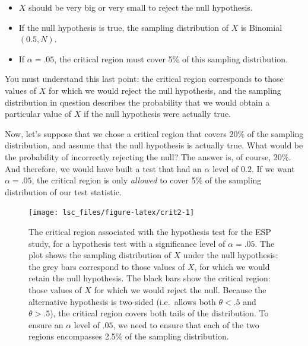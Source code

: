 \documentclass[
  11pt,
  a4paper,
  twoside,symmetric,openright]{book}
\providecommand{\tightlist}{%
  \setlength{\itemsep}{0pt}\setlength{\parskip}{0pt}}
\theoremstyle{break}
\theoremstyle{break}
\begin{document}
\begin{itemize}
\tightlist
\item
  \(X\) should be very big or very small to reject the null hypothesis.
\item
  If the null hypothesis is true, the sampling distribution of \(X\) is Binomial\((0.5, N)\).
\item
  If \(\alpha =.05\), the critical region must cover 5\% of this sampling distribution.
\end{itemize}

You must understand this last point: the critical region corresponds to those values of \(X\) for which we would reject the null hypothesis, and the sampling distribution in question describes the probability that we would obtain a particular value of \(X\) if the null hypothesis were actually true.

Now, let's suppose that we chose a critical region that covers 20\% of the sampling distribution, and assume that the null hypothesis is actually true. What would be the probability of incorrectly rejecting the null? The answer is, of course, 20\%. And therefore, we would have built a test that had an \(\alpha\) level of \(0.2\). If we want \(\alpha = .05\), the critical region is only \emph{allowed} to cover 5\% of the sampling distribution of our test statistic.



\begin{figure}

{\centering \texttt{[image: lsc\_files/figure-latex/crit2-1]} 

}

\caption{The critical region associated with the hypothesis test for the ESP study, for a hypothesis test with a significance level of \(\alpha = .05\). The plot shows the sampling distribution of \(X\) under the null hypothesis: the grey bars correspond to those values of \(X\), for which we would retain the null hypothesis. The black bars show the critical region: those values of \(X\) for which we would reject the null. Because the alternative hypothesis is two-sided (i.e.~allows both \(\theta <.5\) and \(\theta >.5\)), the critical region covers both tails of the distribution. To ensure an \(\alpha\) level of \(.05\), we need to ensure that each of the two regions encompasses 2.5\% of the sampling distribution.}\label{fig:crit2}
\end{figure}
\end{document}
